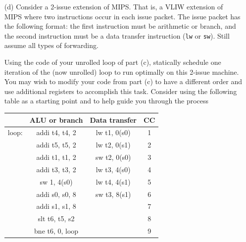 \documentclass[12pt, a4paper]{article}
\begin{document}
\begin{enumerate}
    \item[(d)] 
    Consider a 2-issue extension of MIPS. That is, a VLIW extension of MIPS where two instructions occur in each issue packet. The issue packet has the following format: the first instruction must be arithmetic or branch, and the second instruction must be a data transfer instruction (\texttt{lw} or \texttt{sw}). Still assume all types of forwarding.

    Using the code of your unrolled loop of part (c), statically schedule one iteration of the (now unrolled) loop to run optimally on this 2-issue machine. You may wish to modify your code from part (c) to have a different order and use additional registers to accomplish this task. Consider using the following table as a starting point and to help guide you through the process

    \begin{center}
      \begin{tabular}{|c|c|c|c|}
      \hline
       & ALU or branch & Data transfer & CC \\
      \hline
      loop: & addi t4, t4, 2 & lw   t1, 0(s0) & 1 \\
      \hline
            & addi t5, t5, 2 & lw   t2, 0(s1) & 2 \\
      \hline
            & addi t1, t1, 2 & sw   t2, 0(s0) & 3 \\
      \hline
            & addi t3, t3, 2 & lw   t3, 4(s0) & 4 \\
      \hline
            & sw   1, 4(s0) & lw   t4, 4(s1) & 5 \\
      \hline
            & addi s0, s0, 8 & sw   t3, 8(s1) & 6 \\
      \hline
            & addi s1, s1, 8 & & 7 \\
      \hline
            & slt  t6, t5, s2 & & 8 \\
      \hline
            & bne  t6, 0, loop & & 9 \\
      \hline
      \end{tabular}
      \end{center}
      

\end{enumerate}
\end{document}
